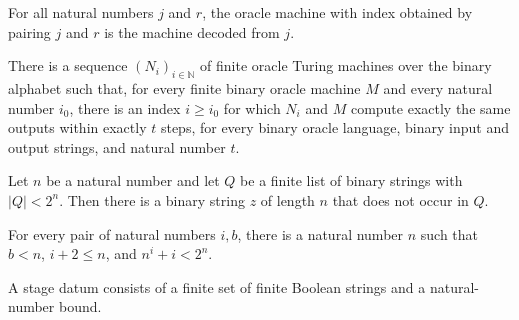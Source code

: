 \begin{theorem}
\label{Complexity.oracleEnumeration_pair}
\leanok
{}
For all natural numbers $j$ and $r$, the oracle machine with index obtained by pairing
$j$ and $r$ is the machine decoded from $j$.
\end{theorem}

\begin{theorem}
\label{Complexity.exists_finOracleTM_enumeration}
\leanok
{}
There is a sequence $(N_i)_{i\in\mathbb N}$ of finite oracle Turing machines over the
binary alphabet such that, for every finite binary oracle machine $M$ and every natural
number $i_0$, there is an index $i\ge i_0$ for which $N_i$ and $M$ compute exactly the
same outputs within exactly $t$ steps, for every binary oracle language, binary input
and output strings, and natural number $t$.
\end{theorem}

\begin{theorem}
\label{Complexity.exists_length_not_mem}
\leanok
{}
Let $n$ be a natural number and let $Q$ be a finite list of binary strings with
$|Q|<2^n$. Then there is a binary string $z$ of length $n$ that does not occur in $Q$.
\end{theorem}

\begin{theorem}
\label{Complexity.exists_fresh_len}
\leanok
{}
For every pair of natural numbers $i,b$, there is a natural number $n$ such that $b<n$,
$i+2\le n$, and $n^i+i<2^n$.
\end{theorem}

\begin{definition}
\label{Complexity.StageData}
\leanok
A stage datum consists of a finite set of finite Boolean strings and a natural-number
bound.
\end{definition}

